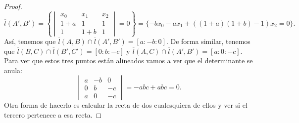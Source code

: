 \begin{proof}
\[ \overline{l}\left(A',B'\right) = \left\{ \begin{vmatrix} x_{0} & x_{1} & x_{2} \\ 1 +a & 1 & 1 \\ 1 & 1 + b & 1 \end{vmatrix}=0 \right\} = \{-bx_{0} -ax_{1} + \left(\left(1 + a\right)\left(1 + b\right)-1\right)x_{2} = 0\}.\]
Así, tenemos que $\displaystyle \overline{l}\left(A,B\right) \cap \overline{l}\left(A',B'\right) = [a : - b : 0] $. De forma similar, tenemos que $\displaystyle \overline{l}\left(B,C\right) \cap \overline{l}\left(B',C'\right) =  [0 : b : - c] $ y $\displaystyle \overline{l}\left(A,C\right) \cap \overline{l}\left(A',B'\right) = [a : 0 : - c] $.
Para ver que estos tres puntos están alineados vamos a ver que el determinante se anula:
\[\begin{vmatrix} a & - b & 0 \\ 0 & b & - c \\ a & 0 & - c \end{vmatrix} = -abc + abc = 0 .\]
Otra forma de hacerlo es calcular la recta de dos cualesquiera de ellos y ver si el tercero pertenece a esa recta. 
\end{proof}

